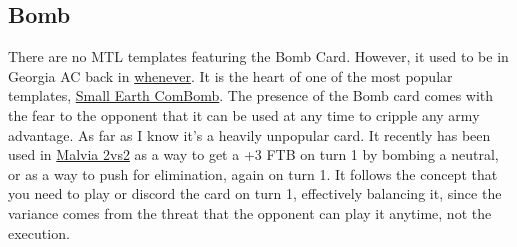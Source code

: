 \subsection{Bomb}

There are no MTL templates featuring the Bomb Card. However, it used to be in Georgia AC back in \href{https://www.warzone.com/MultiPlayer/Tournament?ID=21039}{whenever}. It is the heart of one of the most popular templates, \href{https://www.warzone.com/LadderSeason?ID=4095}{Small Earth ComBomb}. The presence of the Bomb card comes with the fear to the opponent that it can be used at any time to cripple any army advantage. As far as I know it's a heavily unpopular card. It recently has been used in \href{https://www.warzone.com/MultiPlayer/Tournament?ID=59911}{Malvia 2vs2} as a way to get a +3 FTB on turn 1 by bombing a neutral, or as a way to push for elimination, again on turn 1. It follows the concept that you need to play or discord the card on turn 1, effectively balancing it, since the variance comes from the threat that the opponent can play it anytime, not the execution. 
